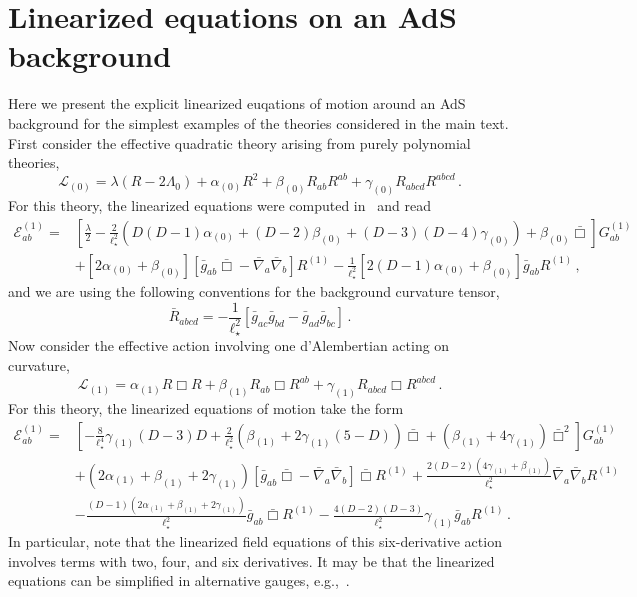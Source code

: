 \documentclass[11pt]{article}
\newcommand{\be}{\begin{equation}}
\newcommand{\ee}{\end{equation} }
\begin{document}
{\section{Linearized equations on an AdS background}\label{adsbck}
Here we present the explicit linearized euqations of motion around an AdS background for the simplest examples of the theories considered in the main text.  First consider the effective quadratic theory arising from purely polynomial theories,
\be 
\mathcal{L}_{(0)} = \lambda \left(R - 2 \Lambda_0\right) + \alpha_{(0)} R^2 +\beta_{(0)}  R_{ab} R^{ab}+\gamma_{(0)} R_{abcd} R^{abcd} \, .
\ee
For this theory, the linearized equations were computed in~\cite{Aspects} and read
\begin{align}
 \mathcal{E}_{ab}^{(1)}=&  \left[\frac{\lambda}{2} - \frac{2}{\ell_\star^2}\left( D(D-1) \alpha_{(0)} + (D-2) \beta_{(0)} + (D-3)(D-4)\gamma_{(0)} \right)  + \beta_{(0)} \bar{\Box} \right] G_{ab}^{(1)} 
 \nonumber
\\
&+ \left[2\alpha_{(0)} + \beta_{(0)} \right] \left[\bar{g}_{ab} \bar{\Box} - \bar{\nabla}_a \bar{\nabla}_{b} \right] R^{(1)}  
- \frac{1}{\ell_\star^2} \left[2(D-1)\alpha_{(0)} + \beta_{(0)} \right] \bar{g}_{ab} R^{(1)} \, ,
\end{align}
and we are using the following conventions for the background curvature tensor,
\be 
\bar{R}_{abcd} = - \frac{1}{\ell_\star^2} \left[\bar{g}_{a c} \bar{g}_{bd} - \bar{g}_{a d} \bar{g}_{b c} \right] \, .
\ee
Now consider the effective action involving one d'Alembertian acting on curvature,
\be 
\mathcal{L}_{(1)} =\alpha_{(1)} R\Box  R+\beta_{(1)}  R_{ab}\Box R^{ab}+\gamma_{(1)} R_{abcd} \Box R^{abcd} \, .
\ee
For this theory, the linearized equations of motion take the form
\begin{align}
\mathcal{E}_{ab}^{(1)}=& \left[ -\frac{8}{\ell_\star^4}\gamma_{(1)}  (D-3) D  + \frac{2}{\ell_\star^2} (\beta_{(1)} + 2 \gamma_{(1)} (5 - D) ) \bar{\Box} + (\beta_{(1)} +4 \gamma_{(1)} ) \bar{\Box}^2 \right] G_{ab}^{(1)}
\nonumber
\\
&   
+ \left(2 \alpha_{(1)} + \beta_{(1)} + 2 \gamma_{(1)} \right) \left[\bar{g}_{ab} \bar{\Box} - \bar{\nabla}_a \bar{\nabla}_b \right] \bar{\Box} R^{(1)} + \frac{2 (D-2) (4 \gamma_{(1)} + \beta_{(1)})}{\ell_\star^2} \bar{\nabla}_a \bar{\nabla}_b R^{(1)}
\nonumber 
\\
&- \frac{(D-1)(2 \alpha_{(1)} + \beta_{(1)} + 2 \gamma_{(1)})}{\ell_\star^2}  \bar{g}_{ab} \bar{\Box} R^{(1)} - \frac{4(D-2)(D-3)}{\ell_\star^2} \gamma_{(1)}  \bar{g}_{ab} R^{(1)} \, .
\end{align}
In particular, note that the linearized field equations of this six-derivative action involves terms with two, four, and six derivatives. It may be that the linearized equations can be simplified in alternative gauges, e.g.,~\cite{Kolar:2023mkw}. 

}
\end{document}
